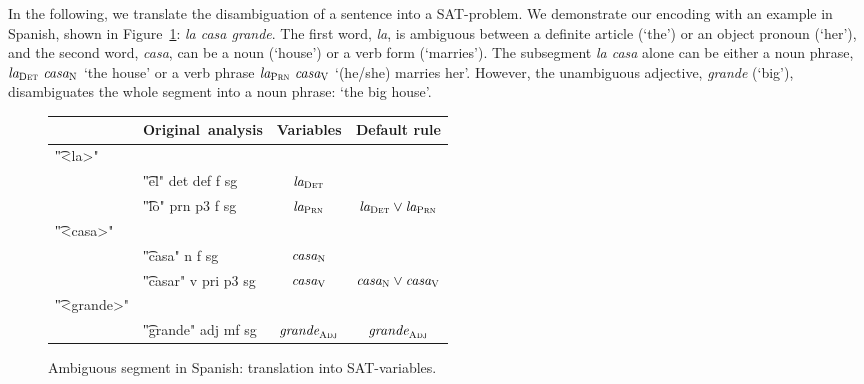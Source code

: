 In the following, we translate the disambiguation of a sentence into a SAT-problem.
We demonstrate our encoding with an example in Spanish, shown in Figure~\ref{fig:laCasaGrande}: {\em la casa grande}. %
The first word, {\em la}, is ambiguous between a definite article (`the') or an object pronoun (`her'), and the second word, {\em casa}, can be a noun (`house') or a verb form (`marries').
The subsegment {\em la casa} alone can be either a noun phrase, $\text{\em la}_{\text{\sc Det}} \ \text{\em casa}_{\text{\sc N}}$ 
`the house'  or a verb phrase $\text{\em la}_{\text{\sc Prn}} \ \text{\em casa}_{\text{\sc V}}$   `(he/she) marries her'. 
However, the unambiguous adjective, {\em grande} (`big'), disambiguates the whole segment into a noun phrase: `the big house'.

\begin{figure}[h]
\centering
\begin{tabular}{p{0.6cm} l | c | c }
   & \textbf{Original~analysis} 
                & \textbf{Variables}
                              & \textbf{Default rule} \\ \hline
\t{"<la>"}   &   &            &  {\small {}} \\
  & \t{"el" 
  det def f sg}  & $\text{\em la}_{\text{\sc Det}}$   &  \\
  & \t{"lo" 
  prn p3 f sg}   & $\text{\em la}_{\text{\sc Prn}}$   &   $\text{\em la}_{\text{\sc Det}} \vee \text{\em la}_{\text{\sc Prn}}$ \\
\t{"<casa>"} &   &            &   \\
  & \t{"casa" 
  n f sg}        & $\text{\em casa}_{\text{\sc N}}$   &  \\
  & \t{"casar"
   v pri p3 sg}  & $\text{\em casa}_{\text{\sc V}}$   & $\text{\em casa}_{\text{\sc N}} \vee \text{\em casa}_{\text{\sc V}}$  \\
\t{"<grande>"} & &            & \\
  & \t{"grande" 
  adj mf sg}   & $\text{\em grande}_{\text{\sc Adj}}$ & $\text{\em grande}_{\text{\sc Adj}}$
\end{tabular}
\caption{Ambiguous segment in Spanish: translation into SAT-variables.}
\label{fig:laCasaGrande}
\end{figure}



